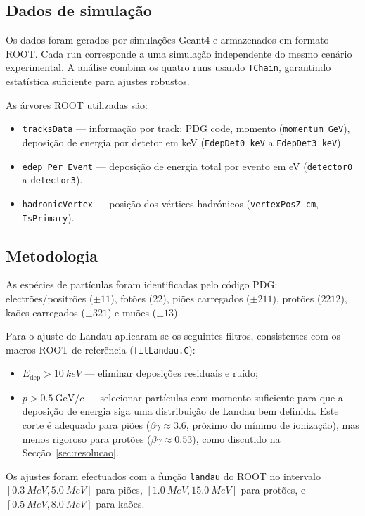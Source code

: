 \documentclass[12pt,a4paper]{article}
\begin{document}
\subsection*{Dados de simulação}

Os dados foram gerados por simulações Geant4 e armazenados em formato ROOT.
Cada run corresponde a uma simulação independente do mesmo cenário experimental.
A análise combina os quatro runs usando \texttt{TChain}, garantindo estatística
suficiente para ajustes robustos.

As árvores ROOT utilizadas são:
\begin{itemize}
  \item \texttt{tracksData} — informação por track: PDG code, momento
    (\texttt{momentum\_GeV}), deposição de energia por detetor em keV
    (\texttt{EdepDet0\_keV} a \texttt{EdepDet3\_keV}).
  \item \texttt{edep\_Per\_Event} — deposição de energia total por evento
    em eV (\texttt{detector0} a \texttt{detector3}).
  \item \texttt{hadronicVertex} — posição dos vértices hadrónicos
    (\texttt{vertexPosZ\_cm}, \texttt{IsPrimary}).
\end{itemize}

\subsection*{Metodologia}

As espécies de partículas foram identificadas pelo código PDG:
electrões/positrões ($\pm 11$), fotões ($22$), piões carregados ($\pm 211$),
protões ($2212$), kaões carregados ($\pm 321$) e muões ($\pm 13$).

Para o ajuste de Landau aplicaram-se os seguintes filtros, consistentes com
os macros ROOT de referência (\texttt{fitLandau.C}):
\begin{itemize}
  \item $E_\text{dep} > \SI{10}{keV}$ — eliminar deposições residuais e ruído;
  \item $p > 0.5~\text{GeV}/c$ — selecionar partículas com momento suficiente
    para que a deposição de energia siga uma distribuição de Landau bem definida.
    Este corte é adequado para piões ($\beta\gamma \approx 3.6$, próximo do mínimo
    de ionização), mas menos rigoroso para protões ($\beta\gamma \approx 0.53$),
    como discutido na Secção~\ref{sec:resolucao}.
\end{itemize}

Os ajustes foram efectuados com a função \texttt{landau} do ROOT no intervalo
$[\SI{0.3}{MeV}, \SI{5.0}{MeV}]$ para piões, $[\SI{1.0}{MeV}, \SI{15.0}{MeV}]$
para protões, e $[\SI{0.5}{MeV}, \SI{8.0}{MeV}]$ para kaões.
\end{document}
